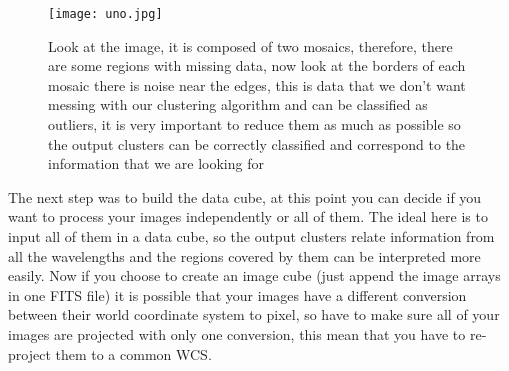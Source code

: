 \documentclass[11pt,fleqn]{book} %
\begin{document}
\begin{figure}[h]
	\centering
    \texttt{[image: uno.jpg]}
    \caption{Look at the image, it is composed of two mosaics, therefore, there are some regions with missing data, now look at the borders of each mosaic there is noise near the edges, this is data that we don't want messing with our clustering algorithm and can be classified as outliers, it is very important to reduce them as much as possible so the output clusters can be correctly classified and correspond to the information that we are looking for}
    \label{img:dos}
\end{figure}

The next step was to build the data cube, at this point you can decide if you want to process your images independently or all of them. The ideal here is to input all of them in a data cube, so the output clusters relate information from all the wavelengths and the regions covered by them can be interpreted more easily. Now if you choose to create an image cube (just append the image arrays in one FITS file) it is possible that your images have a different conversion between their world coordinate system to pixel, so have to make sure all of your images are projected with only one conversion, this mean that you have to re-project them to a common WCS.
\end{document}
